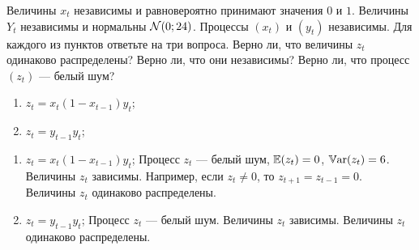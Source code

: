 \begin{problem}
Величины $x_t$ независимы и равновероятно принимают значения $0$ и $1$. Величины $Y_t$ независимы и нормальны $\mathcal{N}(0;24)$.
Процессы $(x_t)$ и $(y_t)$ независимы. Для каждого из пунктов ответьте на три вопроса. Верно ли, что величины $z_t$ одинаково распределены? Верно ли, что они независимы? Верно ли, что процесс $(z_t)$ — белый шум? 
\begin{enumerate}
  \item $z_t = x_t (1-x_{t-1})y_t$;  
\item $z_t = y_{t-1}y_t$;
\end{enumerate}
\begin{sol}

\begin{enumerate}
  \item $z_t = x_t (1-x_{t-1})y_t$;  
    Процесс $z_t$ — белый шум, $\mathbb{E}(z_t)=0$, $\mathbb{V}\mathrm{ar}(z_t)=6$. Величины $z_t$ зависимы. Например, если $z_t \neq 0$, то $z_{t+1}=z_{t-1}=0$. Величины $z_t$ одинаково распределены.
\item $z_t = y_{t-1}y_t$; 
Процесс $z_t$ — белый шум. Величины $z_t$ зависимы. Величины $z_t$ одинаково распределены.
\end{enumerate}


\end{sol}
\end{problem}




